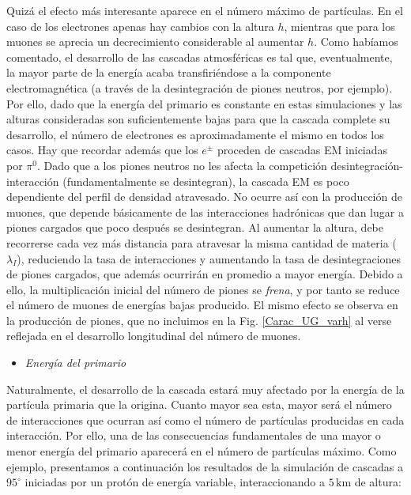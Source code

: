 \documentclass[11 pt, a4paper]{article} %
\numberwithin{equation}{section}
\numberwithin{figure}{section}
\numberwithin{table}{section}
\begin{document}
Quizá el efecto más interesante aparece en el número máximo de partículas. En el caso de los electrones apenas hay cambios con la altura $h$, mientras que para los muones se aprecia un decrecimiento considerable al aumentar $h$. Como habíamos comentado, el desarrollo de las cascadas atmosféricas es tal que, eventualmente, la mayor parte de la energía acaba transfiriéndose a la componente electromagnética (a través de la desintegración de piones neutros, por ejemplo). Por ello, dado que la energía del primario es constante en estas simulaciones y las alturas consideradas son suficientemente bajas para que la cascada complete su desarrollo, el número de electrones es aproximadamente el mismo en todos los casos. Hay que recordar además que los $e^\pm$ proceden de cascadas EM iniciadas por $\pi^0$. Dado que a los piones neutros no les afecta la competición desintegración-interacción (fundamentalmente se desintegran), la cascada EM es poco dependiente del perfil de densidad atravesado. No ocurre así con la producción de muones, que depende básicamente de las interacciones hadrónicas que dan lugar a piones cargados que poco después se desintegran. Al aumentar la altura, debe recorrerse cada vez más distancia para atravesar la misma cantidad de materia ($\lambda_I$), reduciendo la tasa de interacciones y aumentando la tasa de desintegraciones de piones cargados, que además ocurrirán en promedio a mayor energía. Debido a ello, la multiplicación inicial del número de piones se \textit{frena}, y por tanto se reduce el número de muones de energías bajas producido. El mismo efecto se observa en la producción de piones, que no incluimos en la Fig. \ref{Carac_UG_varh} al verse reflejada en el desarrollo longitudinal del número de muones.
\begin{itemize}
	\item \textit{Energía del primario}
\end{itemize}
Naturalmente, el desarrollo de la cascada estará muy afectado por la energía de la partícula primaria que la origina. Cuanto mayor sea esta, mayor será el número de interacciones que ocurran así como el número de partículas producidas en cada interacción. Por ello, una de las consecuencias fundamentales de una mayor o menor energía del primario aparecerá en el número de partículas máximo. Como ejemplo, presentamos a continuación los resultados de la simulación de cascadas a $95^\circ$ iniciadas por un protón de energía variable, interaccionando a $5\,\mathrm{km}$ de altura: 
\end{document}
